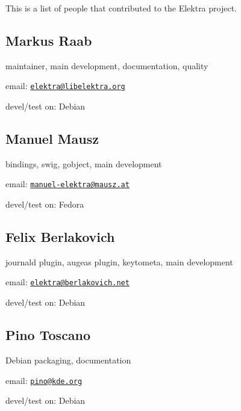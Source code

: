 This is a list of people that contributed to the Elektra project.

\subsection*{Markus Raab}

maintainer, main development, documentation, quality


\begin{DoxyItemize}
\item email\+: \href{mailto:elektra@libelektra.org}{\tt elektra@libelektra.\+org}
\item devel/test on\+: Debian
\end{DoxyItemize}

\subsection*{Manuel Mausz}

bindings, swig, gobject, main development


\begin{DoxyItemize}
\item email\+: \href{mailto:manuel-elektra@mausz.at}{\tt manuel-\/elektra@mausz.\+at}
\item devel/test on\+: Fedora
\end{DoxyItemize}

\subsection*{Felix Berlakovich}

journald plugin, augeas plugin, keytometa, main development


\begin{DoxyItemize}
\item email\+: \href{mailto:elektra@berlakovich.net}{\tt elektra@berlakovich.\+net}
\item devel/test on\+: Debian
\end{DoxyItemize}

\subsection*{Pino Toscano}

Debian packaging, documentation


\begin{DoxyItemize}
\item email\+: \href{mailto:pino@kde.org}{\tt pino@kde.\+org}
\item devel/test on\+: Debian
\end{DoxyItemize}

